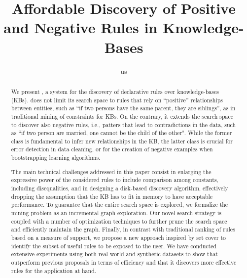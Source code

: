 \documentclass{sig-alternate}
\title{Affordable Discovery of Positive and Negative Rules in Knowledge-Bases}
\date{}
\begin{document}
%


\author{us
}


\maketitle
 
\begin{abstract}
We present \sys, a system for the discovery of declarative rules over knowledge-bases (KBs).
\sys does not limit its search space to rules that rely on ``positive'' relationships between entities, such as ``if two persons have the same parent, they are siblings'', as in traditional mining of constraints for KBs. On the contrary, it extends the search space to discover also negative rules, i.e., patters that lead to contradictions in the data, such as ``if two person are married, one cannot be the child of the other". While the former class is fundamental to infer new relationships in the KB, the latter class is crucial for error detection in data cleaning, or for the creation of negative examples when bootstrapping learning algorithms.

The main technical challenges addressed in this paper consist in enlarging the expressive power of the considered rules to include comparison among constants, including disequalities, and in designing a disk-based discovery algorithm, effectively dropping the assumption that the KB has to fit in memory to have acceptable performance. 
To guarantee that the entire search space is explored, we formalize the mining problem as an incremental graph exploration. Our novel search strategy is coupled with a number of optimization techniques to further prune the search space and efficiently maintain the graph. 
%
Finally, in contrast with traditional ranking of rules based on a measure of support, we propose a new approach inspired by set cover to identify the subset of useful rules to be exposed to the user. 
%
We have conducted extensive experiments using both real-world and synthetic datasets to show that \sys outperform previous proposals in terms of efficiency and that it discovers more effective rules for the application at hand.
\end{abstract} 

%

%

%

%

%

%

%

%



{\small
\vspace*{-1ex}


}

%
\end{document}
